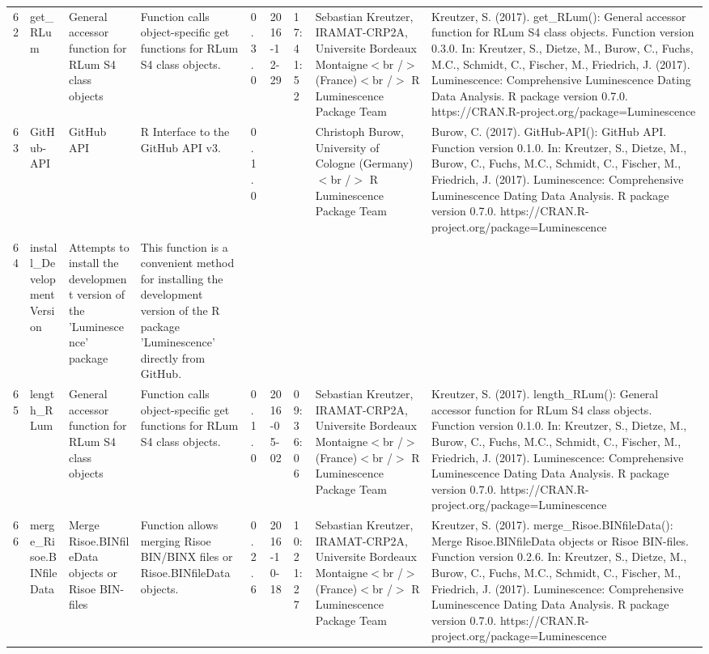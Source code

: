 \begin{table}[ht]
\begin{tabular}{rllllllll}
  62 & get\_RLum & General accessor function for RLum S4 class objects & Function calls object-specific get functions for RLum S4 class objects. & 0.3.0 & 2016-12-29 & 17:41:52
 & Sebastian Kreutzer, IRAMAT-CRP2A, Universite Bordeaux Montaigne$<$br /$>$ (France)$<$br /$>$  R Luminescence Package Team & Kreutzer, S. (2017). get\_RLum(): General accessor function for RLum S4 class objects. Function version 0.3.0. In: Kreutzer, S., Dietze, M., Burow, C., Fuchs, M.C., Schmidt, C., Fischer, M., Friedrich, J. (2017). Luminescence: Comprehensive Luminescence Dating Data Analysis. R package version 0.7.0. https://CRAN.R-project.org/package=Luminescence
 \\ 
  63 & GitHub-API & GitHub API & R Interface to the GitHub API v3. & 0.1.0
 &  &  & Christoph Burow, University of Cologne (Germany)$<$br /$>$  R Luminescence Package Team & Burow, C. (2017). GitHub-API(): GitHub API. Function version 0.1.0. In: Kreutzer, S., Dietze, M., Burow, C., Fuchs, M.C., Schmidt, C., Fischer, M., Friedrich, J. (2017). Luminescence: Comprehensive Luminescence Dating Data Analysis. R package version 0.7.0. https://CRAN.R-project.org/package=Luminescence
 \\ 
  64 & install\_DevelopmentVersion & Attempts to install the development version of the 'Luminescence' package & This function is a convenient method for installing the development version of the R package 'Luminescence' directly from GitHub. &  &  &  &  &  \\ 
  65 & length\_RLum & General accessor function for RLum S4 class objects & Function calls object-specific get functions for RLum S4 class objects. & 0.1.0 & 2016-05-02 & 09:36:06
 & Sebastian Kreutzer, IRAMAT-CRP2A, Universite Bordeaux Montaigne$<$br /$>$ (France)$<$br /$>$  R Luminescence Package Team & Kreutzer, S. (2017). length\_RLum(): General accessor function for RLum S4 class objects. Function version 0.1.0. In: Kreutzer, S., Dietze, M., Burow, C., Fuchs, M.C., Schmidt, C., Fischer, M., Friedrich, J. (2017). Luminescence: Comprehensive Luminescence Dating Data Analysis. R package version 0.7.0. https://CRAN.R-project.org/package=Luminescence
 \\ 
  66 & merge\_Risoe.BINfileData & Merge Risoe.BINfileData objects or Risoe BIN-files & Function allows merging Risoe BIN/BINX files or Risoe.BINfileData objects. & 0.2.6 & 2016-10-18 & 10:21:27
 & Sebastian Kreutzer, IRAMAT-CRP2A, Universite Bordeaux Montaigne$<$br /$>$ (France)$<$br /$>$  R Luminescence Package Team & Kreutzer, S. (2017). merge\_Risoe.BINfileData(): Merge Risoe.BINfileData objects or Risoe BIN-files. Function version 0.2.6. In: Kreutzer, S., Dietze, M., Burow, C., Fuchs, M.C., Schmidt, C., Fischer, M., Friedrich, J. (2017). Luminescence: Comprehensive Luminescence Dating Data Analysis. R package version 0.7.0. https://CRAN.R-project.org/package=Luminescence

\end{tabular}
\end{table}
